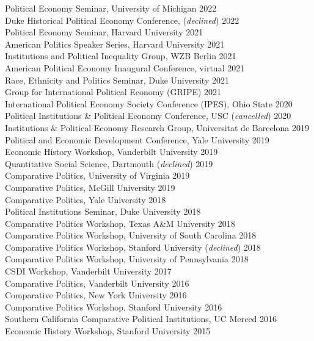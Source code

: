 \documentclass[11pt]{article}
\begin{document}
\begin{minipage}[t]{.79\textwidth}
\vspace{-.1in}
Political Economy Seminar, University of Michigan \hfill 2022 \\
Duke Historical Political Economy Conference, (\emph{declined}) \hfill 2022 \\
Political Economy Seminar, Harvard University \hfill 2021 \\
American Politics Speaker Series, Harvard University \hfill 2021 \\
Institutions and Political Inequality Group, WZB Berlin \hfill 2021 \\
American Political Economy Inaugural Conference, virtual \hfill 2021 \\
Race, Ethnicity and Politics Seminar, Duke University \hfill 2021 \\
Group for International Political Economy (GRIPE) \hfill 2021 \\
International Political Economy Society Conference (IPES), Ohio State \hfill 2020 \\
Political Institutions \& Political Economy Conference, USC (\emph{cancelled}) \hfill 2020 \\
Institutions \& Political Economy Research Group, Universitat de Barcelona \hfill 2019 \\
Political and Economic Development Conference, Yale University \hfill 2019 \\
Economic History Workshop, Vanderbilt University \hfill 2019 \\
Quantitative Social Science, Dartmouth (\emph{declined}) \hfill 2019 \\
Comparative Politics, University of Virginia \hfill 2019 \\
Comparative Politics, McGill University \hfill 2019 \\
Comparative Politics, Yale University \hfill 2018 \\
Political Institutions Seminar, Duke University \hfill 2018 \\
Comparative Politics Workshop, Texas A\&M University \hfill 2018 \\
Comparative Politics Workshop, University of South Carolina \hfill 2018 \\
Comparative Politics Workshop, Stanford University (\emph{declined}) \hfill 2018 \\
Comparative Politics Workshop, University of Pennsylvania \hfill 2018 \\
CSDI Workshop, Vanderbilt University \hfill 2017 \\
Comparative Politics, Vanderbilt University \hfill 2016 \\
Comparative Politics, New York University \hfill 2016 \\
Comparative Politics Workshop, Stanford University \hfill 2016 \\
Southern California Comparative Political Institutions, UC Merced \hfill 2016 \\
Economic History Workshop, Stanford University \hfill 2015 \\
\end{minipage}
\end{document}

